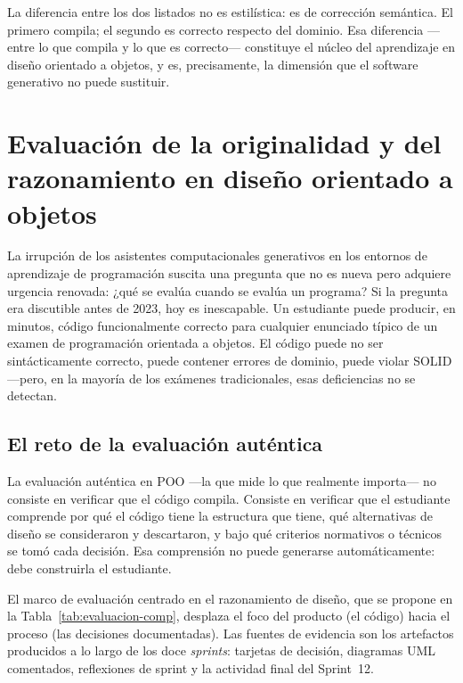 La diferencia entre los dos listados no es estilística: es de corrección semántica.
El primero compila; el segundo es correcto respecto del dominio. Esa diferencia ---entre
lo que compila y lo que es correcto--- constituye el núcleo del aprendizaje en diseño
orientado a objetos, y es, precisamente, la dimensión que el software generativo no
puede sustituir.

\section{Evaluación de la originalidad y del razonamiento en diseño orientado a objetos}
\label{sec:evaluacion-originalidad}

\noindent
La irrupción de los asistentes computacionales generativos en los entornos de
aprendizaje de programación suscita una pregunta que no es nueva pero adquiere
urgencia renovada: ¿qué se evalúa cuando se evalúa un programa? Si la pregunta
era discutible antes de 2023, hoy es inescapable. Un estudiante puede producir,
en minutos, código funcionalmente correcto para cualquier enunciado típico de
un examen de programación orientada a objetos. El código puede no ser
sintácticamente correcto, puede contener errores de dominio, puede violar SOLID ---pero, en
la mayoría de los exámenes tradicionales, esas deficiencias no se detectan.

\subsection{El reto de la evaluación auténtica}
\label{subsec:evaluacion-autentica}

La evaluación auténtica en POO ---la que mide lo que realmente importa---
no consiste en verificar que el código compila. Consiste en verificar que el
estudiante comprende por qué el código tiene la estructura que tiene, qué
alternativas de diseño se consideraron y descartaron, y bajo qué criterios
normativos o técnicos se tomó cada decisión. Esa comprensión no puede generarse
automáticamente: debe construirla el estudiante.

El marco de evaluación centrado en el razonamiento de diseño, que se propone
en la Tabla~\ref{tab:evaluacion-comp}, desplaza el foco del producto (el código)
hacia el proceso (las decisiones documentadas). Las fuentes de evidencia son
los artefactos producidos a lo largo de los doce \textit{sprints}: tarjetas de
decisión, diagramas UML comentados, reflexiones de sprint y la actividad final
del Sprint~12.

